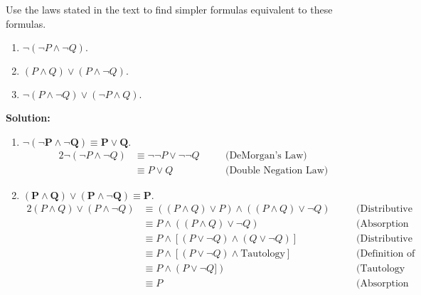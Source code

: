 Use the laws stated in the text to find simpler formulas equivalent to these formulas.
\begin{enumerate}[label=(\alph*)]
    \item $\neg (\neg P \wedge \neg Q).$
    \item $(P \wedge Q) \vee (P \wedge \neg Q).$
    \item $\neg (P \wedge \neg Q) \vee (\neg P \wedge Q).$
\end{enumerate}

\textbf{Solution:}
\begin{enumerate}[label=(\alph*)]
    \item \textbf{$\bm{\neg (\neg P \wedge \neg Q) \equiv P \vee Q.}$}
        \begin{alignat*}{2}
            \neg (\neg P \wedge \neg Q) & \equiv \neg \neg P \vee \neg \neg Q && \quad \text{(DeMorgan's Law)} \\
            & \equiv P \vee Q && \quad \text{(Double Negation Law)}
        \end{alignat*}

    \item \textbf{$\bm{(P \wedge Q) \vee (P \wedge \neg Q) \equiv P.}$}
        \begin{alignat*}{2}
            (P \wedge Q) \vee (P \wedge \neg Q) & \equiv ((P \wedge Q) \vee P) \wedge ((P \wedge Q) \vee \neg Q) && \quad \text{(Distributive Law)}\\
            &\equiv P \wedge ((P \wedge Q) \vee \neg Q) && \quad \text{(Absorption Law)} \\
            &\equiv P \wedge [(P \vee \neg Q) \wedge (Q \vee \neg Q)] && \quad \text{(Distributive Law)} \\
            &\equiv P \wedge [(P \vee \neg Q) \wedge \text{Tautology}] && \quad \text{(Definition of Tautology)} \\
            &\equiv P \wedge (P \vee \neg Q]) && \quad \text{(Tautology Law)} \\
            &\equiv P && \quad \text{(Absorption Law)}
        \end{alignat*}


\end{enumerate}
